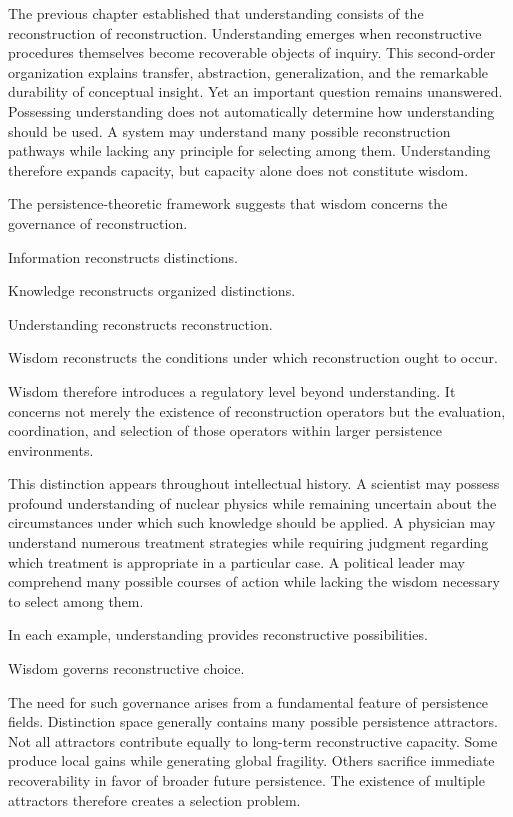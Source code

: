 \documentclass[12pt,oneside]{article}
\theoremstyle{definition}
\begin{document}
The previous chapter established that understanding consists of the reconstruction of reconstruction. Understanding emerges when reconstructive procedures themselves become recoverable objects of inquiry. This second-order organization explains transfer, abstraction, generalization, and the remarkable durability of conceptual insight. Yet an important question remains unanswered. Possessing understanding does not automatically determine how understanding should be used. A system may understand many possible reconstruction pathways while lacking any principle for selecting among them. Understanding therefore expands capacity, but capacity alone does not constitute wisdom.

The persistence-theoretic framework suggests that wisdom concerns the governance of reconstruction.

Information reconstructs distinctions.

Knowledge reconstructs organized distinctions.

Understanding reconstructs reconstruction.

Wisdom reconstructs the conditions under which reconstruction ought to occur.

Wisdom therefore introduces a regulatory level beyond understanding. It concerns not merely the existence of reconstruction operators but the evaluation, coordination, and selection of those operators within larger persistence environments.

This distinction appears throughout intellectual history. A scientist may possess profound understanding of nuclear physics while remaining uncertain about the circumstances under which such knowledge should be applied. A physician may understand numerous treatment strategies while requiring judgment regarding which treatment is appropriate in a particular case. A political leader may comprehend many possible courses of action while lacking the wisdom necessary to select among them.

In each example, understanding provides reconstructive possibilities.

Wisdom governs reconstructive choice.

The need for such governance arises from a fundamental feature of persistence fields. Distinction space generally contains many possible persistence attractors. Not all attractors contribute equally to long-term reconstructive capacity. Some produce local gains while generating global fragility. Others sacrifice immediate recoverability in favor of broader future persistence. The existence of multiple attractors therefore creates a selection problem.
\end{document}

